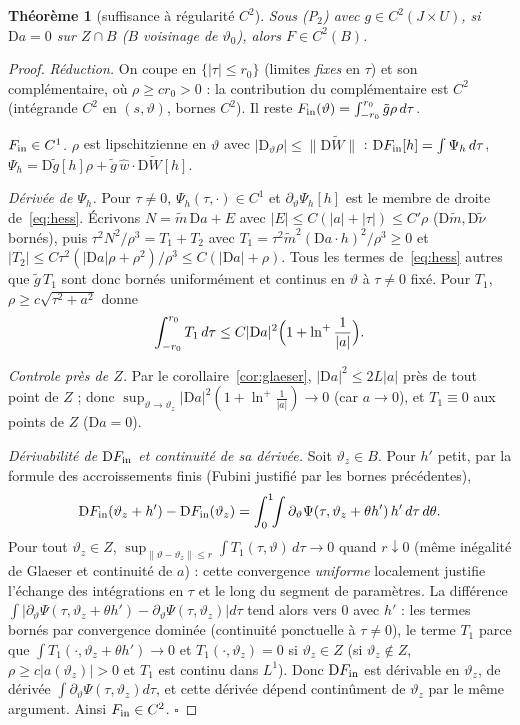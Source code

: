 \documentclass[11pt,a4paper]{article}
\newtheorem{theoreme}{Théorème}
\theoremstyle{remark}
\newcommand{\vth}{\vartheta}
\newcommand{\D}{\mathrm D}
\begin{document}
\begin{theoreme}[suffisance à régularité $C^2$]\label{thm:S}
Sous (P$_2$) avec $g\in C^2(J\times U)$, si $\D a=0$ sur $Z\cap B$ ($B$ voisinage de $\vth_0$), alors $F\in C^2(B)$.
\end{theoreme}
\begin{proof}
\emph{Réduction.} On coupe en $\{\lvert\tau\rvert\le r_0\}$ (limites \emph{fixes} en $\tau$) et son complémentaire, où $\rho\ge cr_0>0$ : la contribution du complémentaire est $C^2$ (intégrande $C^2$ en $(s,\vth)$, bornes $C^2$). Il reste $F_{\rm in}(\vth)=\int_{-r_0}^{r_0}\tilde g\rho\,d\tau$.

\emph{$F_{\rm in}\in C^1$.} $\rho$ est lipschitzienne en $\vth$ avec $\lvert\D_\vth\rho\rvert\le\lVert\D\tilde W\rVert$ : $\D F_{\rm in}[h]=\int\Psi_h\,d\tau$, $\Psi_h=\D\tilde g[h]\rho+\tilde g\,\hat w\!\cdot\!\D\tilde W[h]$.

\emph{Dérivée de $\Psi_h$.} Pour $\tau\ne0$, $\Psi_h(\tau,\cdot)\in C^1$ et $\partial_\vth\Psi_h[h]$ est le membre de droite de~\eqref{eq:hess}. Écrivons $N=\tilde m\,\D a+E$ avec $\lvert E\rvert\le C(\lvert a\rvert+\lvert\tau\rvert)\le C'\rho$ ($\D\tilde m,\D\tilde\nu$ bornés), puis $\tau^2N^2/\rho^3=T_1+T_2$ avec $T_1=\tau^2\tilde m^2(\D a\cdot h)^2/\rho^3\ge0$ et $\lvert T_2\rvert\le C\tau^2(\lvert\D a\rvert\rho+\rho^2)/\rho^3\le C(\lvert\D a\rvert+\rho)$. Tous les termes de~\eqref{eq:hess} autres que $\tilde g\,T_1$ sont donc bornés uniformément et continus en $\vth$ à $\tau\ne0$ fixé. Pour $T_1$, $\rho\ge c\sqrt{\tau^2+a^2}$ donne
\[
\int_{-r_0}^{r_0}T_1\,d\tau\le C\lvert\D a\rvert^2\Bigl(1+\ln^+\frac1{\lvert a\rvert}\Bigr).
\]

\emph{Controle près de $Z$.} Par le corollaire~\ref{cor:glaeser}, $\lvert\D a\rvert^2\le2L\lvert a\rvert$ près de tout point de $Z$ ; donc $\sup_{\vth\to\vth_z}\lvert\D a\rvert^2(1+\ln^+\frac1{\lvert a\rvert})\to0$ (car $a\to0$), et $T_1\equiv0$ aux points de $Z$ ($\D a=0$).

\emph{Dérivabilité de $\D F_{\rm in}$ et continuité de sa dérivée.} Soit $\vth_z\in B$. Pour $h'$ petit, par la formule des accroissements finis (Fubini justifié par les bornes précédentes),
\[
\D F_{\rm in}(\vth_z+h')-\D F_{\rm in}(\vth_z)=\int_0^1\!\!\int\partial_\vth\Psi(\tau,\vth_z+\theta h')\,h'\,d\tau\,d\theta .
\]
Pour tout $\vth_z\in Z$, $\sup_{\lVert\vth-\vth_z\rVert\le r}\int T_1(\tau,\vth)\,d\tau\to0$ quand $r\downarrow0$ (même inégalité de Glaeser et continuité de $a$) : cette convergence \emph{uniforme} localement justifie l'échange des intégrations en $\tau$ et le long du segment de paramètres. La différence $\int\lvert\partial_\vth\Psi(\tau,\vth_z+\theta h')-\partial_\vth\Psi(\tau,\vth_z)\rvert d\tau$ tend alors vers $0$ avec $h'$ : les termes bornés par convergence dominée (continuité ponctuelle à $\tau\ne0$), le terme $T_1$ parce que $\int T_1(\cdot,\vth_z+\theta h')\to0$ et $T_1(\cdot,\vth_z)=0$ si $\vth_z\in Z$ (si $\vth_z\notin Z$, $\rho\ge c\lvert a(\vth_z)\rvert>0$ et $T_1$ est continu dans $L^1$). Donc $\D F_{\rm in}$ est dérivable en $\vth_z$, de dérivée $\int\partial_\vth\Psi(\tau,\vth_z)d\tau$, et cette dérivée dépend continûment de $\vth_z$ par le même argument. Ainsi $F_{\rm in}\in C^2$. $\square$
\end{proof}
\end{document}
